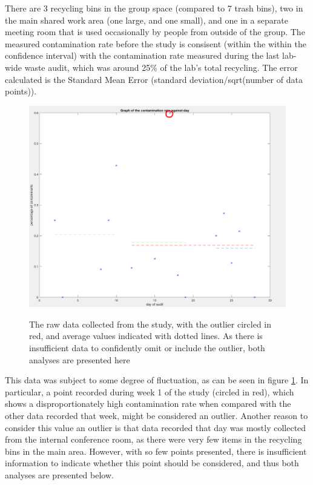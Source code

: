 \documentclass[nofonts,nols,justified,nobib]{tufte-book}
\begin{document}
There are 3 recycling bins in the group space (compared to 7 trash bins), two in the main shared work area (one large, and one small), and one in a separate meeting room that is used occasionally by people from outside of the group. The measured contamination rate before the study is consisent (within the within the confidence interval) with the contamination rate measured during the last lab-wide waste audit, which was around 25\% of the lab's total recycling. The error calculated is the Standard Mean Error (standard deviation/sqrt(number of data points)).

\begin{figure}
  \caption{The raw data collected from the study, with the outlier circled in red, and average values indicated with dotted lines. As there is insufficient data to confidently omit or include the outlier, both analyses are presented here}
  \includegraphics[width=1\linewidth]{img/4/finalresults/showing-outlier.png}
  \label{rawpoints}
\end{figure}

This data was subject to some degree of fluctuation, as can be seen in figure \ref{rawpoints}. In particular, a point recorded during week 1 of the study (circled in red), which shows a disproportionately high contamination rate when compared with the other data recorded that week, might be considered an outlier. Another reason to consider this value an outlier is that data recorded that day was mostly collected from the internal conference room, as there were very few items in the recycling bins in the main area. However, with so few points presented, there is insufficient information to indicate whether this point should be considered, and thus both analyses are presented below.
\end{document}

